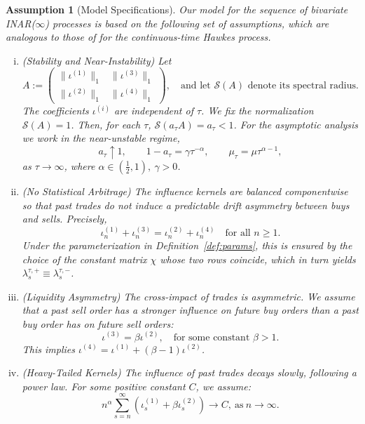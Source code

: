 \documentclass[letterpaper]{article}
\numberwithin{equation}{section}
\newtheorem{assumption}[theorem]{Assumption}
\theoremstyle{definition}
\theoremstyle{remark}
\begin{document}
\begin{assumption}[Model Specifications]\label{ass:main}
Our model for the sequence of bivariate INAR($\infty$) processes is based on the following set of assumptions, which are analogous to those of \cite{el2019characteristic} for the continuous-time Hawkes process.
\begin{enumerate}[(i)]
    \item \textit{(Stability and Near-Instability)}
    Let 
    \[
    A:=\begin{pmatrix}
    \|\iota^{(1)}\|_1 & \|\iota^{(3)}\|_1\\
    \|\iota^{(2)}\|_1 & \|\iota^{(4)}\|_1
    \end{pmatrix},
    \quad\text{and let } \mathcal S(A) \text{ denote its spectral radius.}
    \]
    The coefficients $\iota^{(i)}$ are independent of $\tau$. We fix the normalization
    $\mathcal S(A)=1$.
    Then, for each $\tau$, $\mathcal S(a_\tau A)=a_\tau<1$.
    For the asymptotic analysis we work in the near-unstable regime, 
    \[
    a_\tau \uparrow 1,\qquad 1-a_\tau= \gamma\tau^{-\alpha},\qquad 
    \mu_\tau=\mu\tau^{\alpha-1},
    \]
    as $\tau\rightarrow\infty$, where $\alpha\in(\frac12,1),\ \gamma>0$.

    \item \textit{(No Statistical Arbitrage)} The influence kernels are balanced \emph{componentwise} so that past trades do not induce a predictable drift asymmetry between buys and sells. Precisely,
    \[
        \iota^{(1)}_n+\iota^{(3)}_n=\iota^{(2)}_n+\iota^{(4)}_n\quad\text{for all }n\ge1.
    \]
    Under the parameterization in Definition~\ref{def:params}, this is ensured by the choice of the constant matrix $\chi$ whose two rows coincide, which in turn yields $\lambda^{\tau,+}_s\equiv \lambda^{\tau,-}_s$.

    \item \textit{(Liquidity Asymmetry)} The cross-impact of trades is asymmetric. We assume that a past sell order has a stronger influence on future buy orders than a past buy order has on future sell orders:
    \[
        \iota^{(3)}=\beta \iota^{(2)}, \quad \text{for some constant } \beta>1.
    \]
    This implies $\iota^{(4)}=\iota^{(1)}+(\beta-1)\iota^{(2)}$.

    \item \textit{(Heavy-Tailed Kernels)} The influence of past trades decays slowly, following a power law. For some positive constant $C$, we assume:
    \[
        n^\alpha \sum_{s=n}^\infty \left( \iota_s^{(1)}+\beta\iota_s^{(2)} \right)\rightarrow C,\ \text{as}\ n\rightarrow \infty.
    \]
\end{enumerate}
\end{assumption}
\end{document}
